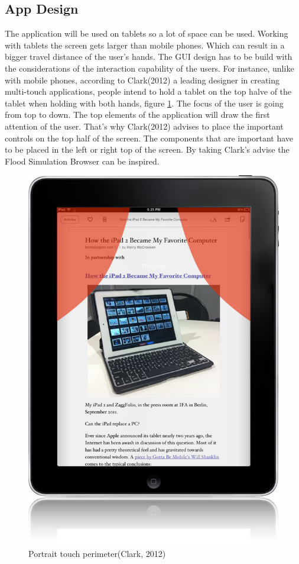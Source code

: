 \subsection{App Design}
The application will be used on tablets so a lot of space can be used. Working with tablets the screen gets larger than mobile phones. Which can result in a bigger travel distance of the user's hands. The GUI design has to be build with the considerations of the interaction capability of the users. For instance, unlike with mobile phones, according to Clark(2012) a leading designer in creating multi-touch applications, people intend to hold a tablet on the top halve of the tablet when holding with both hands, figure \ref{fig:perimeter}. The focus of the user is going from top to down. The top elements of the application will draw the first attention of the user. That's why Clark(2012) advises to place the important controls on the top half of the screen. The components that are important have to be placed in the left or right top of the screen. By taking Clark's advise the Flood Simulation Browser can be inspired.
\begin{figure}[ht]
\center
\includegraphics[scale=0.3]{touch.png}
\caption{Portrait touch perimeter(Clark, 2012)}
\label{fig:perimeter}
\end{figure}
